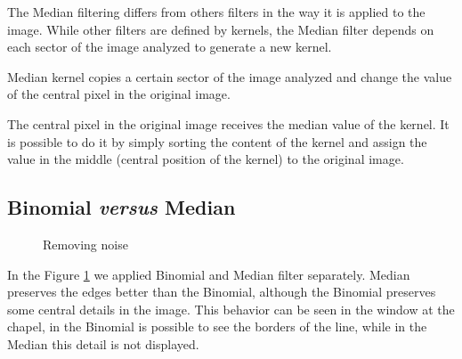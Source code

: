 \documentclass{article}
\begin{document}
		The Median filtering differs from others filters in the way it is applied to the image. While other filters are defined by kernels, the Median filter depends on each sector of the image analyzed to generate a new kernel.

		Median kernel copies a certain sector of the image analyzed and change the value of the central pixel in the original image. 

		The central pixel in the original image receives the median value of the kernel. It is possible to do it by simply sorting the content of the kernel and assign the value in the middle (central position of the kernel) to the original image. 

	\subsection{Binomial {\it versus} Median}

		\begin{figure}[H]
		  \centering
		  \caption{Removing noise}
		  \label{fig:removingnoise}
		\end{figure}		

	In the Figure \ref{fig:removingnoise} we applied Binomial and Median filter separately. 
	Median preserves the edges better than the Binomial, although the Binomial preserves some central details in the image. 
	This behavior can be seen in the window at the chapel, in the Binomial is possible to see the borders of the line, while in the Median this detail is not displayed. 
\end{document}
